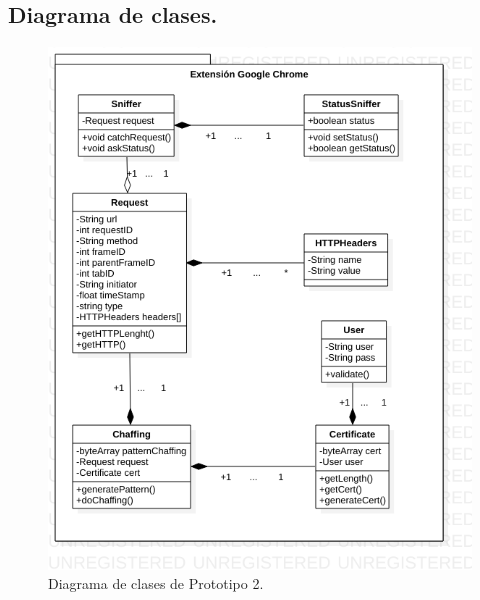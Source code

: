 \documentclass[12pt, a4paper, titlepage]{report}
\begin{document}
			\subsection{Diagrama de clases.}
			
    			\begin{figure}[H]
    				\begin{center}	\includegraphics[width=13cm]{./imagenes/Desarrollo/Prototipo_2/DC_P2.png}
    				\caption{Diagrama de clases de Prototipo 2.}
    				\end{center}
    			\end{figure}
			    
			    \newpage
\end{document}
